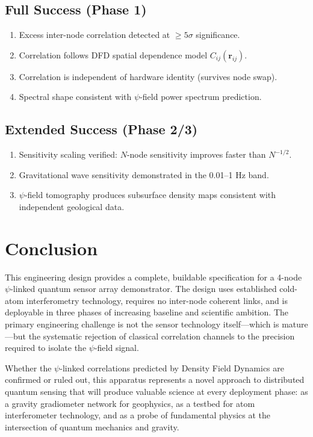 \documentclass[12pt,a4paper]{article}
\begin{document}
\subsection{Full Success (Phase 1)}

\begin{enumerate}
\item Excess inter-node correlation detected at $\geq 5\sigma$ significance.
\item Correlation follows DFD spatial dependence model
$C_{ij}(\mathbf{r}_{ij})$.
\item Correlation is independent of hardware identity (survives node swap).
\item Spectral shape consistent with $\psi$-field power spectrum prediction.
\end{enumerate}

\subsection{Extended Success (Phase 2/3)}

\begin{enumerate}
\item Sensitivity scaling verified: $N$-node sensitivity improves faster
than $N^{-1/2}$.
\item Gravitational wave sensitivity demonstrated in the 0.01--1 Hz band.
\item $\psi$-field tomography produces subsurface density maps consistent
with independent geological data.
\end{enumerate}


\section{Conclusion}\label{sec:conclusion}

This engineering design provides a complete, buildable specification for
a 4-node $\psi$-linked quantum sensor array demonstrator. The design uses
established cold-atom interferometry technology, requires no inter-node
coherent links, and is deployable in three phases of increasing baseline
and scientific ambition. The primary engineering challenge is not the
sensor technology itself---which is mature---but the systematic rejection
of classical correlation channels to the precision required to isolate
the $\psi$-field signal.

Whether the $\psi$-linked correlations predicted by Density Field Dynamics
are confirmed or ruled out, this apparatus represents a novel approach to
distributed quantum sensing that will produce valuable science at every
deployment phase: as a gravity gradiometer network for geophysics,
as a testbed for atom interferometer technology, and as a probe of
fundamental physics at the intersection of quantum mechanics and gravity.
\end{document}
